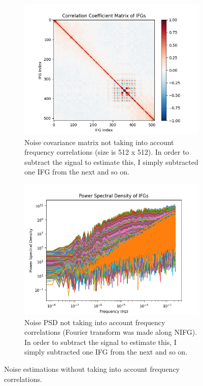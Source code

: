 \documentclass{article}
\begin{document}
\begin{figure}[ht]
	\centering
	\begin{subfigure}{.45\textwidth}
	  \centering
	  \includegraphics[width=\linewidth]{Figures/cov.png}
	  \caption{Noise covariance matrix not taking into account frequency correlations (size is 512 x 512). In order to subtract the signal to estimate this, I simply subtracted one IFG from the next and so on.}
	  \label{fig:cov-matrix}
	\end{subfigure}
	\begin{subfigure}{.45\textwidth}
	  \centering
	  \includegraphics[width=\linewidth]{Figures/psd.png}
	  \caption{Noise PSD not taking into account frequency correlations (Fourier transform was made along NIFG). In order to subtract the signal to estimate this, I simply subtracted one IFG from the next and so on.}
	  \label{fig:psd}
	\end{subfigure}
	\caption{Noise estimations without taking into account frequency correlations.}
	\label{fig:noise-estimation}
\end{figure}
\end{document}
